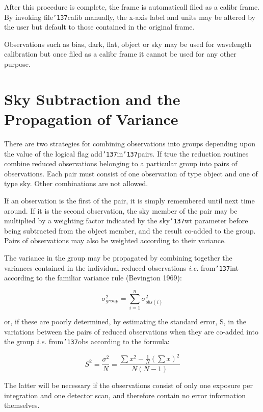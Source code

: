 \documentclass[a4paper]{book}
\renewcommand{\_}{{\tt\char'137}}
\begin{document}
After this procedure is complete, the frame is automaticall filed as a {\sc
calibr} frame. By invoking file\_calib manually, the x-axis label and units may be 
altered by the user but default to those contained in the original frame. 

Observations such as {\sc bias}, {\sc dark}, {\sc flat}, {\sc object} or 
{\sc sky} may be used for wavelength calibration but once filed as a
{\sc calibr} frame it cannot be used for any other purpose. 

\section{Sky Subtraction and the Propagation of Variance}
There are two strategies for combining observations into groups depending
upon the value of the logical flag add\_in\_pairs. If {\sc true} the
reduction routines combine reduced observations belonging to a particular
group into pairs of observations. Each pair must consist of one
observation of type {\sc object} and one of type {\sc sky}. Other
combinations are not allowed. 

If an observation is the first of the pair, it is simply remembered until
next time around. If it is the second observation, the {\sc sky} member of
the pair may be multiplied by a weighting factor indicated by the sky\_wt
parameter before being subtracted from the {\sc object} member, and the
result co-added to the group. Pairs of observations may also be weighted
according to their variance. 

The variance in the group may be propagated by combining together the
variances contained in the individual reduced observations {\em i.e.}
{\sc from\_int} according to the familiar variance rule (Bevington 1969): 

\begin{equation}
\sigma^{2}_{group} = \sum_{i=1}^{n} \sigma^{2}_{obs(i)} \label{equation_2}
\end{equation}

or, if these are poorly determined, by estimating the standard error, S,
in the variations between the pairs of reduced observations when they are
co-added into the group {\em i.e.} {\sc from\_obs} according to the
formula: 

\begin{equation}
S^2 = \frac{\sigma^2}{N} = \frac{\sum x^{2} - \frac{1}{N}(\sum x )^{2}}{N(N-1)} \label{equation_3}
\end{equation}

The latter will be necessary if the observations consist of only one
exposure per integration and one detector scan, and therefore contain no
error information themselves. 
\end{document}
